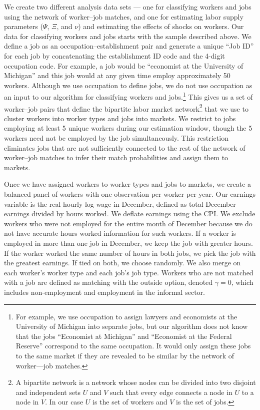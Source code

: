 \documentclass[12pt]{article}
\def\g{\gamma}
\theoremstyle{definition}
\theoremstyle{plain}
\begin{document}
We create two different analysis data sets --- one for classifying workers and jobs using the network of worker--job matches, and one for estimating labor supply parameters ($\Psi$, $\Xi$, and $\nu$) and estimating the effects of shocks on workers. Our data for classifying workers and jobs starts with the sample described above.  We define a job as an occupation--establishment pair and generate a unique ``Job ID'' for each job by concatenating the establishment ID code and the 4-digit occupation code.  For example, a job would be ``economist at the University of Michigan'' and this job would at any given time employ approximately 50 workers. Although we use occupation to define jobs, we do not use occupation as an input to our algorithm for classifying workers and jobs.\footnote{For example, we use occupation to assign lawyers and economists at the University of Michigan into separate jobs, but our algorithm does not know that the jobs ``Economist at Michigan'' and ``Economist at the Federal Reserve'' correspond to the same occupation.  It would only assign these jobs to the same market if they are revealed to be similar by the network of worker—job matches.}  This gives us a set of worker--job pairs that define the bipartite labor market network\footnote{A bipartite network is a network whose nodes can be divided into two disjoint and independent sets $U$ and $V$ such that every edge connects a node in $U$ to a node in $V$. In our case $U$ is the set of workers and $V$ is the set of jobs.} that we use to cluster workers into worker types and jobs into markets. We restrict to jobs employing at least 5 unique workers during our estimation window, though the 5 workers need not be employed by the job simultaneously. This restriction eliminates jobs that are not sufficiently connected to the rest of the network of worker--job matches to infer their match probabilities and assign them to markets. 


Once we have assigned workers to worker types and jobs to markets, we create a balanced panel of workers with one observation per worker per year. Our earnings variable is the real hourly log wage in December, defined as total December earnings divided by hours worked. We deflate earnings using the CPI. We exclude workers who were not employed for the entire month of December because we do not have accurate hours worked information for such workers. If a worker is employed in more than one job in December, we keep the job with greater hours. If the worker worked the same number of hours in both jobs, we pick the job with the greatest earnings. If tied on both, we choose randomly. We also merge on each worker's worker type and each job's job type. Workers who are not matched with a job are defined as matching with the outside option, denoted $\g=0$, which includes non-employment and employment in the informal sector. 
\end{document}
